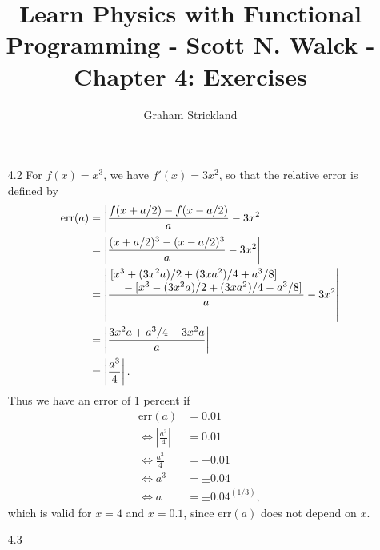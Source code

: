 \documentclass{article}
\title{Learn Physics with Functional Programming - Scott N. Walck - Chapter 4: Exercises}
\author{Graham Strickland}
\begin{document}
\maketitle  

\begin{itemize}
    \item[4.2]
    For $f(x) = x^3$, we have $f'(x) = 3x^2$, so that the relative error is defined by
    \begin{equation*}
        \begin{split}
            \text{err}(a) &= \left| \frac{f(x + a/2) - f(x - a/2)}{a} - 3x^2 \right| \\
            &= \left| \frac{(x + a/2)^3 - (x - a/2)^3}{a} - 3x^2 \right| \\
            &= \left| \frac{\splitfrac{[x^3 + (3x^2a)/2 + (3xa^2)/4 + a^3/8]}
                {{} - [x^3 - (3x^2a)/2 + (3xa^2)/4 - a^3/8]}}{a} - 3x^2 \right| \\
            &= \left| \frac{3x^2a + a^3/4 - 3x^2a}{a} \right| \\
            &= \left| \frac{a^3}{4} \right|.
        \end{split}
    \end{equation*}
    \qquad Thus we have an error of 1 percent if 
    \begin{equation*}
        \begin{split}
            \text{err}(a) &= 0.01 \\
            \Leftrightarrow \left|\frac{a^3}{4}\right| &= 0.01 \\
            \Leftrightarrow \frac{a^3}{4} &= \pm 0.01 \\
            \Leftrightarrow a^3 &= \pm 0.04 \\
            \Leftrightarrow a &= \pm {0.04}^{(1/3)},
        \end{split}
    \end{equation*}
    which is valid for $x = 4$ and $x = 0.1$, since $\text{err}(a)$ does not depend on $x$.
    \item[4.3]
\end{itemize}
\end{document}
